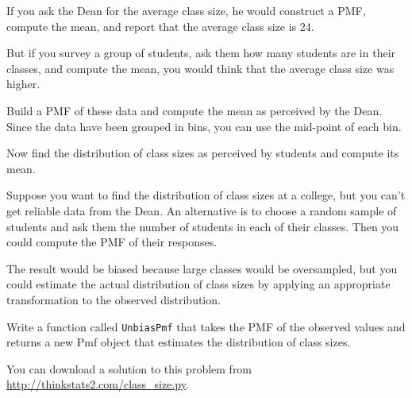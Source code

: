 \documentclass[12pt]{book}
\begin{document}
If you ask the Dean for the average class size, he would
construct a PMF, compute the mean, and report that the
average class size is 24.

But if you survey a group of students, ask them how many
students are in their classes, and compute the mean, you would
think that the average class size was higher.

\begin{exercise}
Build a PMF of these data and compute the mean as perceived by the
Dean.  Since the data have been grouped in bins, you can use the
mid-point of each bin.

Now find the distribution of class sizes as perceived by students
and compute its mean.  

Suppose you want to find the distribution of class sizes at a
college, but you can't get reliable data from the Dean.
An alternative is to choose a random sample of students and ask them
the number of students in each of their classes.  Then you could compute
the PMF of their responses.

The result would be biased because large classes
would be oversampled, but you could estimate the actual
distribution of class sizes by applying an appropriate transformation
to the observed distribution.

Write a function called \verb"UnbiasPmf" that takes the PMF of the
observed values and returns a new Pmf object that estimates the
distribution of class sizes.

You can download a solution to this problem from
\url{http://thinkstats2.com/class_size.py}.

\end{exercise}
\end{document}
